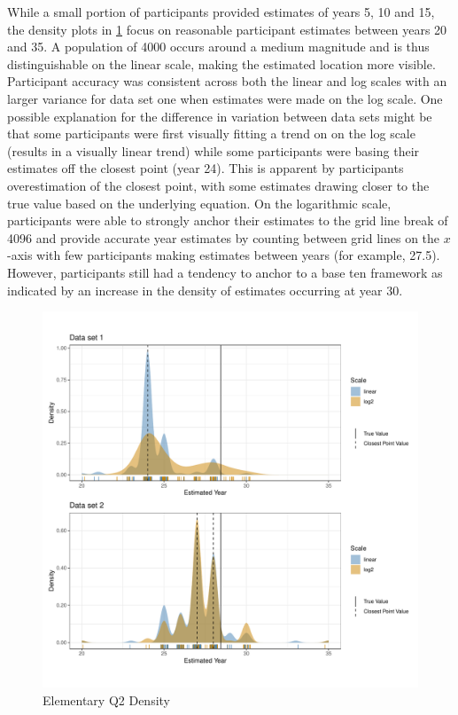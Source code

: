\documentclass[print]{nuthesis}
\begin{document}
While a small portion of participants provided estimates of years 5, 10 and 15, the density plots in \cref{fig:qe2-density-plot} focus on reasonable participant estimates between years 20 and 35.
A population of 4000 occurs around a medium magnitude and is thus distinguishable on the linear scale, making the estimated location more visible.
Participant accuracy was consistent across both the linear and log scales with an larger variance for data set one when estimates were made on the log scale.
One possible explanation for the difference in variation between data sets might be that some participants were first visually fitting a trend on on the log scale (results in a visually linear trend) while some participants were basing their estimates off the closest point (year 24).
This is apparent by participants overestimation of the closest point, with some estimates drawing closer to the true value based on the underlying equation.
On the logarithmic scale, participants were able to strongly anchor their estimates to the grid line break of 4096 and provide accurate year estimates by counting between grid lines on the \(x\)-axis with few participants making estimates between years (for example, 27.5).
However, participants still had a tendency to anchor to a base ten framework as indicated by an increase in the density of estimates occurring at year 30.

\begin{figure}[tbp]

{\centering \includegraphics[width=1\linewidth,]{thesis_files/figure-latex/qe2-density-plot-1} 

}

\caption{Elementary Q2 Density}\label{fig:qe2-density-plot}
\end{figure}
\end{document}
